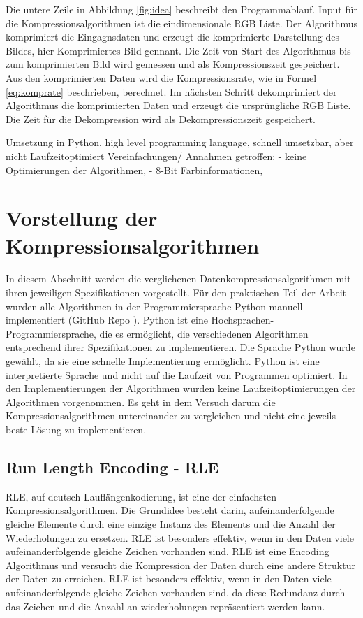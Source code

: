 \documentclass[conference]{IEEEtran}
\begin{document}
Die untere Zeile in Abbildung \ref{fig:idea} beschreibt den Programmablauf.
Input für die Kompressionsalgorithmen ist die eindimensionale RGB Liste.
Der Algorithmus komprimiert die Eingagnsdaten und erzeugt die komprimierte 
Darstellung des Bildes, hier Komprimiertes Bild gennant.
Die Zeit von Start des Algorithmus bis zum komprimierten Bild wird gemessen 
und als Kompressionszeit gespeichert.
Aus den komprimierten Daten wird die Kompressionsrate, wie in Formel \ref{eq:komprate}
beschrieben, berechnet.
Im nächsten Schritt dekomprimiert der Algorithmus die komprimierten Daten und 
erzeugt die ursprüngliche RGB Liste.
Die Zeit für die Dekompression wird als Dekompressionszeit gespeichert.









Umsetzung in Python, high level programming language, schnell umsetzbar, aber nicht
Laufzeitoptimiert
Vereinfachungen/ Annahmen getroffen:
- keine Optimierungen der Algorithmen,
- 8-Bit Farbinformationen,




\section{Vorstellung der Kompressionsalgorithmen}

In diesem Abschnitt werden die verglichenen Datenkompressionsalgorithmen 
mit ihren jeweiligen Spezifikationen vorgestellt. 
Für den praktischen Teil der Arbeit wurden alle 
Algorithmen in der Programmiersprache Python manuell implementiert
(GitHub Repo \cite{nick}).
Python ist eine Hochsprachen-Programmiersprache, die es ermöglicht, 
die verschiedenen Algorithmen entsprechend ihrer Spezifikationen zu implementieren. 
Die Sprache Python wurde gewählt, da sie eine schnelle Implementierung ermöglicht.
Python ist eine interpretierte Sprache und nicht auf die Laufzeit von Programmen 
optimiert. \cite{nadav}
In den Implementierungen der Algorithmen wurden keine Laufzeitoptimierungen der 
Algorithmen vorgenommen.
Es geht in dem Versuch darum die Kompressionsalgorithmen untereinander zu 
vergleichen und nicht eine jeweils beste Lösung zu implementieren.


\subsection{Run Length Encoding - RLE}

RLE, auf deutsch Lauflängenkodierung, ist eine der einfachsten Kompressionsalgorithmen.
Die Grundidee besteht darin, aufeinanderfolgende gleiche Elemente durch 
eine einzige Instanz des Elements und die Anzahl der Wiederholungen zu ersetzen.
RLE ist besonders effektiv, wenn in den Daten viele aufeinanderfolgende 
gleiche Zeichen vorhanden sind.
RLE ist eine Encoding Algorithmus und versucht die Kompression der Daten 
durch eine andere Struktur der Daten zu erreichen.
RLE ist besonders effektiv, wenn in den Daten viele aufeinanderfolgende 
gleiche Zeichen vorhanden sind, da diese Redundanz durch das Zeichen und die 
Anzahl an wiederholungen repräsentiert werden kann.
\end{document}

